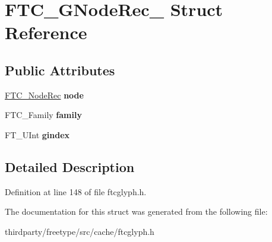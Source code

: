 \hypertarget{struct_f_t_c___g_node_rec__}{}\section{F\+T\+C\+\_\+\+G\+Node\+Rec\+\_\+ Struct Reference}
\label{struct_f_t_c___g_node_rec__}
\subsection*{Public Attributes}
\begin{DoxyCompactItemize}
\item 
\mbox{\label{struct_f_t_c___g_node_rec___a53b5fa8e2c17e423cfe4642752e8ed2a}} 
\hyperlink{struct_f_t_c___node_rec__}{F\+T\+C\+\_\+\+Node\+Rec} {\bfseries node}
\item 
\mbox{\label{struct_f_t_c___g_node_rec___af71af3f57ab54120304825f6d324eefe}} 
F\+T\+C\+\_\+\+Family {\bfseries family}
\item 
\mbox{\label{struct_f_t_c___g_node_rec___a15e4cebdeb65eb5267fc05af15705d0a}} 
F\+T\+\_\+\+U\+Int {\bfseries gindex}
\end{DoxyCompactItemize}


\subsection{Detailed Description}


Definition at line 148 of file ftcglyph.\+h.



The documentation for this struct was generated from the following file\+:\begin{DoxyCompactItemize}
\item 
thirdparty/freetype/src/cache/ftcglyph.\+h\end{DoxyCompactItemize}
